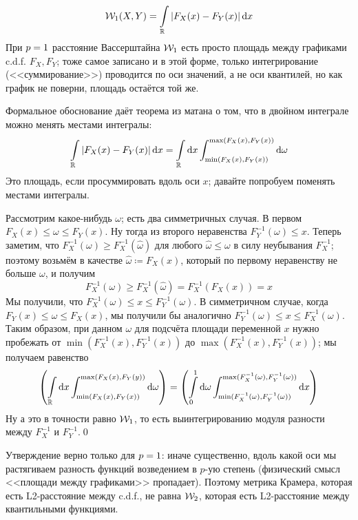 \begin{theorem}
\begin{equation}\label{W1equiv}
\mathcal{W}_1(X, Y) = \int\limits_{\mathbb{R}} \left| F_X(x) - F_Y(x) \right| \mathop{}\!\mathrm{d} x
\end{equation}
\beginproof
При $p \HM= 1$ расстояние Вассерштайна $\mathcal{W}_1$ есть просто площадь между графиками c.d.f. $F_X, F_Y$; тоже самое записано и в этой форме, только интегрирование (<<суммирование>>) проводится по оси значений, а не оси квантилей, но как график не поверни, площадь остаётся той же.

Формальное обоснование даёт теорема из матана о том, что в двойном интеграле можно менять местами интегралы:
$$ \int\limits_{\mathbb{R}} \left| F_X(x) - F_Y(x) \right| \mathop{}\!\mathrm{d} x = \int\limits_{\mathbb{R}} \mathop{}\!\mathrm{d} x \int\nolimits_{\min(F_X(x), F_Y(x))}^{\max(F_X(x), F_Y(x))} \mathop{}\!\mathrm{d} \omega$$
Это площадь, если просуммировать вдоль оси $x$; давайте попробуем поменять местами интегралы. 

Рассмотрим какое-нибудь $\omega$; есть два симметричных случая. В первом $F_X(x) \le \omega \le F_Y(x)$. Ну тогда из второго неравенства $F_Y^{-1}(\omega) \le x$. Теперь заметим, что $F^{-1}_X(\omega) \ge F^{-1}_X(\hat{\omega})$ для любого $\hat{\omega} \le \omega$ в силу неубывания $F^{-1}_X$; поэтому возьмём в качестве $\hat{\omega} \coloneqq F_X(x)$, который по первому неравенству не больше $\omega$, и получим 
$$F^{-1}_X(\omega) \ge F^{-1}_X(\hat{\omega}) = F^{-1}_X(F_X(x)) = x$$
Мы получили, что $F^{-1}_X(\omega) \le x \le F^{-1}_Y(\omega)$. В симметричном случае, когда $F_Y(x) \le \omega \le F_X(x)$, мы получили бы аналогично $F^{-1}_Y(\omega) \le x \le F^{-1}_X(\omega)$. Таким образом, при данном $\omega$ для подсчёта площади переменной $x$ нужно пробежать от $\min(F^{-1}_X(x), F^{-1}_Y(x))$ до $\max(F^{-1}_X(x), F^{-1}_Y(x))$; мы получаем равенство
$$ \left( \int\limits_{\mathbb{R}} \mathop{}\!\mathrm{d} x \int\nolimits_{\min(F_X(x), F_Y(x))}^{\max(F_X(x), F_Y(y))} \mathop{}\!\mathrm{d} \omega \right) = \left( \int\limits_0^1 \mathop{}\!\mathrm{d} \omega \int\nolimits_{\min(F^{-1}_X(\omega), F^{-1}_Y(\omega))}^{\max(F^{-1}_X(\omega), F^{-1}_Y(\omega))} \mathop{}\!\mathrm{d} x \right)$$
Ну а это в точности равно $\mathcal{W}_1$, то есть выинтегрированию модуля разности между $F^{-1}_X$ и $F^{-1}_Y$.\qed

\beginproof[Замечание] Утверждение верно только для $p \HM= 1$: иначе существенно, вдоль какой оси мы растягиваем разность функций возведением в $p$-ую степень (физический смысл <<площади между графиками>> пропадает). Поэтому метрика Крамера, которая есть L2-расстояние между c.d.f., не равна $\mathcal{W}_2$, которая есть L2-расстояние между квантильными функциями.
\end{theorem}

